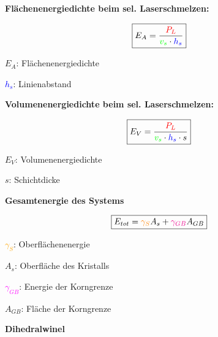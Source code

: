 \textbf{Flächenenergiedichte beim sel. Laserschmelzen:}\\

\begin{minipage}{0.5\linewidth}
    \[
    \boxed{        
        E_A = \frac{\textcolor{red}{P_L}}{\textcolor{green}{v_s} \cdot \textcolor{blue}{h_s}}
    }
    \]
\end{minipage}
\begin{minipage}{0.5\linewidth}
    \item $E_A$: Flächenenergiedichte
    \item \textcolor{blue}{$h_s$}: Linienabstand
\end{minipage}
\vspace{1mm}

\textbf{Volumenenergiedichte beim sel. Laserschmelzen:}\\

\begin{minipage}{0.5\linewidth}
    \[
    \boxed{        
        E_V = \frac{\textcolor{red}{P_L}}{\textcolor{green}{v_s} \cdot \textcolor{blue}{h_s} \cdot s}
    }
    \]
\end{minipage}
\begin{minipage}{0.5\linewidth}
    \item $E_V$: Volumenenergiedichte
    \item $s$: Schichtdicke
\end{minipage}
\vspace{1mm}

\textbf{Gesamtenergie des Systems}\\

\begin{minipage}{0.5\linewidth}
    \[
    \boxed{        
        E_{tot} = \textcolor{orange}{\gamma _S} A_s + \textcolor{magenta}{\gamma _{GB}} A_{GB}
    }
    \]
\end{minipage}
\begin{minipage}{0.5\linewidth}
    \item \textcolor{orange}{$\gamma _S$}: Oberflächenenergie
    \item $A_s$: Oberfläche des Kristalls
    \item \textcolor{magenta}{$\gamma _{GB}$}: Energie der Korngrenze
    \item $A_{GB}$: Fläche der Korngrenze
\end{minipage}
\vspace{1mm}
\vfill \null \columnbreak

\textbf{Dihedralwinel}\\

